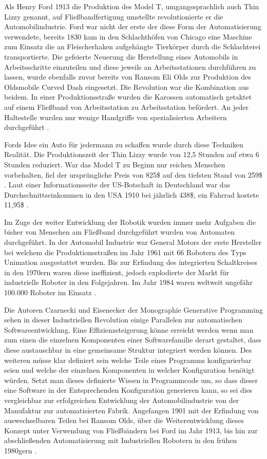 \documentclass[12pt,oneside,a4paper,parskip]{scrbook}
\begin{document}
Als Henry Ford 1913 die Produktion des Model T, umgangssprachlich auch Thin Lizzy genannt, auf Fließbandfertigung umstellte revolutionierte er die Automobilindustrie. Ford war nicht der erste der diese Form der Automatisierung verwendete, bereits 1830 kam in den Schlachthöfen von Chicago eine Maschine zum Einsatz die an Fleischerhaken aufgehängte Tierkörper durch die Schlachterei transportierte. Die gefeierte Neuerung die Herstellung eines Automobils in Arbeitsschritte einzuteilen und diese jeweils an Arbeitsstationen durchführen zu lassen, wurde ebenfalls zuvor bereits von Ransom Eli Olds zur Produktion des Oldsmobile Curved Dash eingesetzt. Die Revolution war die Kombination aus beidem. In einer Produktionsstraße wurden die Karossen automatisch getaktet auf einem Fließband von Arbeitsstation zu Arbeitsstation befördert. An jeder Haltestelle wurden nur wenige Handgriffe von spezialisierten Arbeitern durchgeführt \cite{sagerso2008modelt}.

Fords Idee ein Auto für jedermann zu schaffen wurde durch diese Techniken Realität. Die Produktionszeit der Thin Lizzy wurde von 12,5 Stunden auf etwa 6 Stunden reduziert. War das Model T zu Beginn nur reichen Menschen vorbehalten, fiel der ursprüngliche Preis von 825\$ auf den tiefsten Stand von 259\$ \cite{reichlesz2010modelt}. Laut einer Informationsseite der US-Botschaft in Deutschland war das Durchschnittseinkommen in den USA 1910 bei jährlich 438\$, ein Fahrrad kostete 11,95\$ \cite{usembassyodnumbers}.

Im Zuge der weiter Entwicklung der Robotik wurden immer mehr Aufgaben die bisher von Menschen am Fließband durchgeführt wurden von Automaten durchgeführt. In der Automobil Industrie war General Motors der erste Hersteller bei welchem die Produktionsstraßen im Jahr 1961 mit 66 Robotern des Typs Unimation ausgestattet wurden. Bis zur Erfindung des integrierten Schaltkreises in den 1970ern waren diese ineffizient, jedoch explodierte der Markt für industrielle Roboter in den Folgejahren. Im Jahr 1984 waren weltweit ungefähr 100.000 Roboter im Einsatz \cite{wallen2008robohistory} \cite{czaeis2000genprog}.

Die Autoren Czarnecki und Eisenecker der Monographie Generative Programming sehen in dieser Industriellen Revolution einige Parallelen zur automatischen Softwareentwicklung. Eine Effizienzsteigerung könne erreicht werden wenn man zum einen die einzelnen Komponenten einer Softwarefamilie derart gestaltet, dass diese austauschbar in eine gemeinsame Struktur integriert werden können. Des weiteren müsse klar definiert sein welche Teile eines Programms konfigurierbar seien und welche der einzelnen Komponenten in welcher Konfiguration benötigt würden. Setzt man dieses definierte Wissen in Programmcode um, so dass dieser eine Software in der Entsprechenden Konfiguration generieren kann, so sei dies vergleichbar zur erfolgreichen Entwicklung der Automobilindustrie von der Manufaktur zur automatisierten Fabrik. Angefangen 1901 mit der Erfindung von auswechselbaren Teilen bei Ransom Olds, über die Weiterentwicklung dieses Konzept unter Verwendung von Fließbändern bei Ford im Jahr 1913, bis hin zur abschließenden Automatisierung mit Industriellen Robotern in den frühen 1980gern \cite{czaeis2000genprog}.
\end{document}
